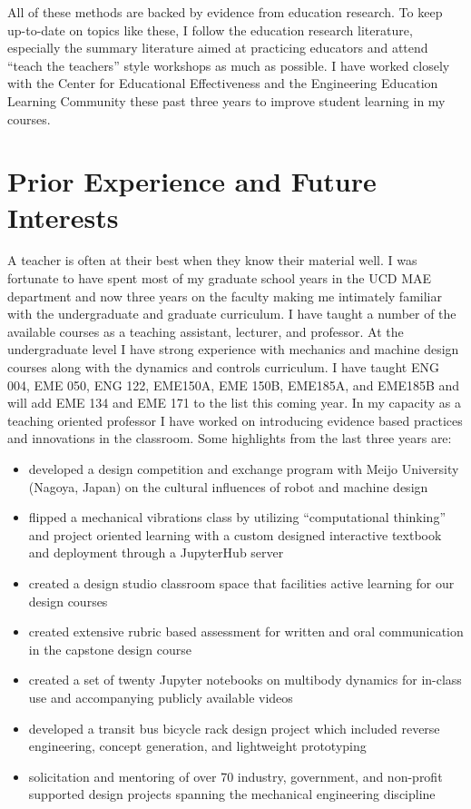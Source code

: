\documentclass[titlepage]{article}
\begin{document}
All of these methods are backed by evidence from education research. To keep
up-to-date on topics like these, I follow the education research literature,
especially the summary literature aimed at practicing educators and attend
``teach the teachers'' style workshops as much as possible. I have worked
closely with the Center for Educational Effectiveness and the Engineering
Education Learning Community these past three years to improve student learning
in my courses.

\section*{Prior Experience and Future Interests}
%
A teacher is often at their best when they know their material well. I was
fortunate to have spent most of my graduate school years in the UCD MAE
department and now three years on the faculty making me intimately familiar
with the undergraduate and graduate curriculum. I have taught a number of the
available courses as a teaching assistant, lecturer, and professor. At the
undergraduate level I have strong experience with mechanics and machine design
courses along with the dynamics and controls curriculum. I have taught ENG 004,
EME 050, ENG 122, EME150A, EME 150B, EME185A, and EME185B and will add EME 134
and EME 171 to the list this coming year. In my capacity as a teaching oriented
professor I have worked on introducing evidence based practices and innovations
in the classroom. Some highlights from the last three years are:

\begin{itemize}
    \setlength\itemsep{0.1em}
  \item developed a design competition and exchange program with Meijo
    University (Nagoya, Japan) on the cultural influences of robot and machine
    design
  \item flipped a mechanical vibrations class by utilizing ``computational
    thinking'' and project oriented learning with a custom designed interactive
    textbook and deployment through a JupyterHub server
  \item created a design studio classroom space that facilities active learning
    for our design courses
  \item created extensive rubric based assessment for written and oral
    communication in the capstone design course
  \item created a set of twenty Jupyter notebooks on multibody dynamics for
    in-class use and accompanying publicly available videos
  \item developed a transit bus bicycle rack design project which included
    reverse engineering, concept generation, and lightweight prototyping
  \item solicitation and mentoring of over 70 industry, government, and
    non-profit supported design projects spanning the mechanical engineering
    discipline
\end{itemize}
\end{document}
